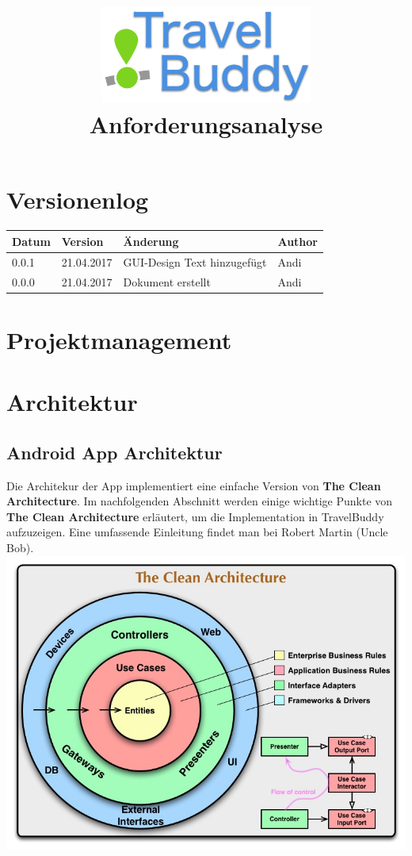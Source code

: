 \documentclass[a4paper,10pt,xetex]{article}
\title{
  \includegraphics[width=7cm]{travel-buddy_white}\\[\bigskipamount]
  Anforderungsanalyse\\[\bigskipamount]
}
\author{\documentauthors}
\date{\parbox{\linewidth}{\centering%
  IT15TA ZH \hspace*{3cm} Gruppe 3\endgraf\bigskip
  \documentdate\endgraf
}}
\begin{document}
\maketitle\newpage

{
\hypersetup{linkcolor=black}
\setcounter{tocdepth}{3}
\tableofcontents
}

\newpage

\section{Versionenlog}\label{versionenlog}

\tabulinesep=1.2mm

\begin{longtabu} to \textwidth { | l | l | X[l] | l | }
  \hline
  \textbf{Datum} & \textbf{Version} & \textbf{Änderung} & \textbf{Author} \\
  \hline
  \endhead

  0.0.1 & 21.04.2017 & GUI-Design Text hinzugefügt & Andi\\
  \hline

  0.0.0 & 21.04.2017 & Dokument erstellt & Andi\\
  \hline
\end{longtabu}
\newpage

\section{Projektmanagement}\label{projektmanagement}
\section{Architektur}\label{architektur}
\subsection{Android App Architektur}\label{androidapparchitektur}

Die Architekur der App implementiert eine einfache Version von \textbf{The Clean Architecture}. Im nachfolgenden Abschnitt werden einige wichtige Punkte von \textbf{The Clean Architecture} erläutert, um die Implementation in TravelBuddy aufzuzeigen. Eine umfassende Einleitung findet man bei Robert Martin (Uncle Bob).
{\includegraphics{cleanarchitecture}}
\end{document}
